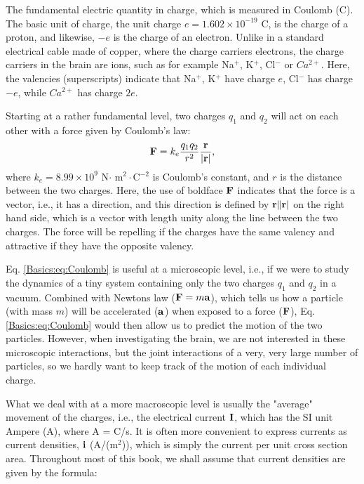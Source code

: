 The fundamental electric quantity in charge, which is measured in Coulomb (C). The basic unit of charge, the unit charge $e = 1.602\times10^{-19}$ C, is the charge of a proton, and likewise, $-e$ is the charge of an electron. Unlike in a standard electrical cable made of copper, where the charge carriers electrons, the charge carriers in the brain are ions, such as for example Na$^+$, K$^+$, Cl$^-$ or $Ca^{2+}$. Here, the valencies (superscripts) indicate that Na$^+$, K$^+$ have charge $e$, Cl$^-$ has charge $-e$, while $Ca^{2+}$ has charge $2e$.

Starting at a rather fundamental level, two charges $q_1$ and $q_2$ will act on each other with a force given by Coulomb's law:
\begin{equation}
{\bf F} = k_e\frac{q_1 q_2}{r^2}\frac{\bf r}{|{\bf r}|},
\label{Basics:eq:Coulomb}
\end{equation}
where $k_e = 8.99\times10^9$ N$\cdot$ m$^2\cdot$C$^{-2}$ is Coulomb's constant, and $r$ is the distance between the two charges. Here, the use of boldface ${\bf F}$ indicates that the force is a vector, i.e., it has a direction, and this direction is defined by ${\bf r}\|{\bf r}|$ on the right hand side, which is a vector with length unity along the line between the two charges. The force will be repelling if the charges have the same valency and attractive if they have the opposite valency. 

Eq. \ref{Basics:eq:Coulomb} is useful at a microscopic level, i.e., if we were to study the dynamics of a tiny system containing only the two charges $q_1$ and $q_2$ in a vacuum. Combined with Newtons law (${\bf F}=m {\bf a}$), which tells us how a particle (with mass $m$) will be accelerated (${\bf a}$)
when exposed to a force (${\bf F}$), Eq. \ref{Basics:eq:Coulomb} would then allow us to predict the motion of the two particles. However, when investigating the brain, we are not interested in these microscopic interactions, but the joint interactions of a very, very large number of particles, so we hardly want to keep track of the motion of each individual charge.

What we deal with at a more macroscopic level is usually the "average" movement of the charges, i.e., the electrical current ${\bf I}$, which has the SI unit Ampere (A), where A = C/s. It is often more convenient to express currents as current densities, ${\bf i}$ (A/(m$^2$)), which is simply the current per unit cross section area. Throughout most of this book, we shall assume that current densities are given by the formula:

